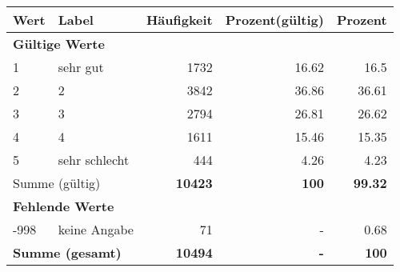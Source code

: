      \begin{longtable}{lXrrr}
     \toprule
     \textbf{Wert} & \textbf{Label} & \textbf{Häufigkeit} & \textbf{Prozent(gültig)} & \textbf{Prozent} \\
     \endhead
     \midrule
     \multicolumn{5}{l}{\textbf{Gültige Werte}}\\

     1 &
     \multicolumn{1}{X}{ sehr gut   } &


       \num{1732} &
       \num[round-mode=places,round-precision=2]{16,62} &
         \num[round-mode=places,round-precision=2]{16,5} \\

     2 &
     \multicolumn{1}{X}{ 2   } &


       \num{3842} &
       \num[round-mode=places,round-precision=2]{36,86} &
         \num[round-mode=places,round-precision=2]{36,61} \\

     3 &
     \multicolumn{1}{X}{ 3   } &


       \num{2794} &
       \num[round-mode=places,round-precision=2]{26,81} &
         \num[round-mode=places,round-precision=2]{26,62} \\

     4 &
     \multicolumn{1}{X}{ 4   } &


       \num{1611} &
       \num[round-mode=places,round-precision=2]{15,46} &
         \num[round-mode=places,round-precision=2]{15,35} \\

     5 &
     \multicolumn{1}{X}{ sehr schlecht   } &


       \num{444} &
       \num[round-mode=places,round-precision=2]{4,26} &
         \num[round-mode=places,round-precision=2]{4,23} \\
     \midrule
     \multicolumn{2}{l}{Summe (gültig)} &
       \textbf{\num{10423}} &
     \textbf{100} &
       \textbf{\num[round-mode=places,round-precision=2]{99,32}} \\
     \multicolumn{5}{l}{\textbf{Fehlende Werte}}\\
       -998 &
       keine Angabe &
         \num{71} &
        - &
         \num[round-mode=places,round-precision=2]{0,68} \\
     \midrule
     \multicolumn{2}{l}{\textbf{Summe (gesamt)}} &
          \textbf{\num{10494}} &
        \textbf{-} &
        \textbf{100} \\
     \bottomrule
     \end{longtable}
     
